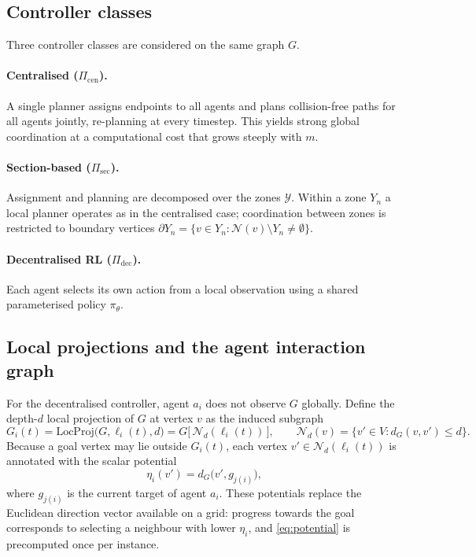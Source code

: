 \subsection{Controller classes}

Three controller classes are considered on the same graph \( G \).

\paragraph{Centralised (\( \Pi_{\mathrm{cen}} \)).}
A single planner assigns endpoints to all agents and plans collision-free
paths for all agents jointly, re-planning at every timestep. This yields
strong global coordination at a computational cost that grows steeply with
\( m \).

\paragraph{Section-based (\( \Pi_{\mathrm{sec}} \)).}
Assignment and planning are decomposed over the zones \( \mathcal{Y} \).
Within a zone \( Y_n \) a local planner operates as in the centralised case;
coordination between zones is restricted to boundary vertices
\( \partial Y_n = \{ v \in Y_n : \mathcal{N}(v) \setminus Y_n \neq \emptyset \} \).

\paragraph{Decentralised RL (\( \Pi_{\mathrm{dec}} \)).}
Each agent selects its own action from a local observation using a shared
parameterised policy \( \pi_\theta \).

\subsection{Local projections and the agent interaction graph}

For the decentralised controller, agent \( a_i \) does not observe \( G \)
globally. Define the depth-\( d \) local projection of \( G \) at vertex
\( v \) as the induced subgraph
\begin{equation}
  G_i(t) = \mathrm{LocProj}\big(G, \ell_i(t), d\big)
         = G\big[\, \mathcal{N}_d(\ell_i(t)) \,\big],
  \qquad
  \mathcal{N}_d(v) = \{ v' \in V : d_G(v, v') \leq d \}.
  \label{eq:locproj}
\end{equation}
Because a goal vertex may lie outside \( G_i(t) \), each vertex
\( v' \in \mathcal{N}_d(\ell_i(t)) \) is annotated with the scalar potential
\begin{equation}
  \eta_i(v') = d_G\big(v', g_{j(i)}\big),
  \label{eq:potential}
\end{equation}
where \( g_{j(i)} \) is the current target of agent \( a_i \). These
potentials replace the Euclidean direction vector available on a grid:
progress towards the goal corresponds to selecting a neighbour with lower
\( \eta_i \), and \eqref{eq:potential} is precomputed once per instance.

